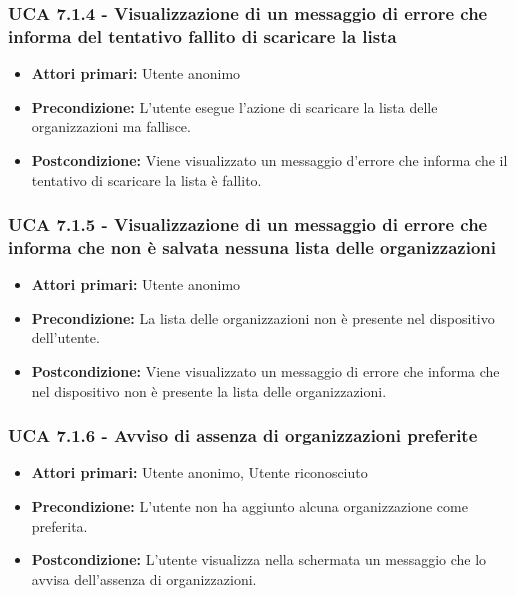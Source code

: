 \subsubsection{UCA 7.1.4 - Visualizzazione di un messaggio di errore che informa del tentativo fallito di scaricare la lista}%
\begin{itemize}
\item \textbf{Attori primari:} Utente anonimo
\item \textbf{Precondizione:} L'utente esegue l'azione di scaricare la lista delle organizzazioni ma fallisce.
\item \textbf{Postcondizione:} Viene visualizzato un messaggio d'errore che informa che il tentativo di scaricare la lista è fallito.

\end{itemize}

\subsubsection{UCA 7.1.5 - Visualizzazione di un messaggio di errore che informa che non è salvata nessuna lista delle organizzazioni}%
\begin{itemize}
	\item \textbf{Attori primari:} Utente anonimo
	\item \textbf{Precondizione:} La lista delle organizzazioni non è presente nel dispositivo dell'utente.
	\item \textbf{Postcondizione:} Viene visualizzato un messaggio di errore che informa che nel dispositivo non è presente la lista delle organizzazioni.
\end{itemize}

\subsubsection{UCA 7.1.6 - Avviso di assenza di organizzazioni preferite}
\begin{itemize}
    \item \textbf{Attori primari:} Utente anonimo, Utente riconosciuto
    \item \textbf{Precondizione:} L'utente non ha aggiunto alcuna organizzazione come preferita.
    \item \textbf{Postcondizione:} L'utente visualizza nella schermata un messaggio che lo avvisa dell'assenza di organizzazioni.
\end{itemize}

